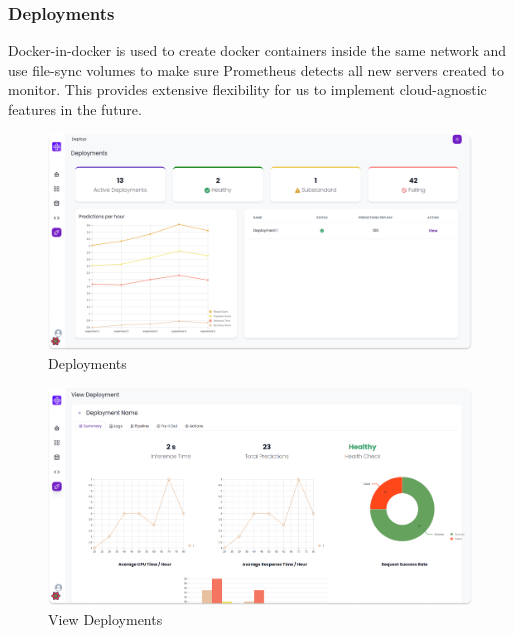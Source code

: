 \documentclass[12pt,a4paper]{report}     %
\begin{document}
\begin{normalsize}
{{{\subsection{Deployments}
Docker-in-docker is used to create docker containers inside the same network and use file-sync volumes to make sure Prometheus detects all new servers created to monitor. This provides extensive flexibility for us to implement cloud-agnostic features in the future. 
\begin{figure}[H]
    \centering
    \includegraphics[scale=0.2]{diagrams/Deployments.png}
    \caption{Deployments}
    \label{fig:builder}
\end{figure}
\begin{figure}[H]
    \centering
    \includegraphics[scale=0.2]{diagrams/View_deployments.png}
    \caption{View Deployments }
    \label{fig:builder}
\end{figure}
\par


\newpage 
\chapter{}
{\setlength{\baselineskip}{1.1\baselineskip}
}}}}
\end{normalsize}
\end{document}
